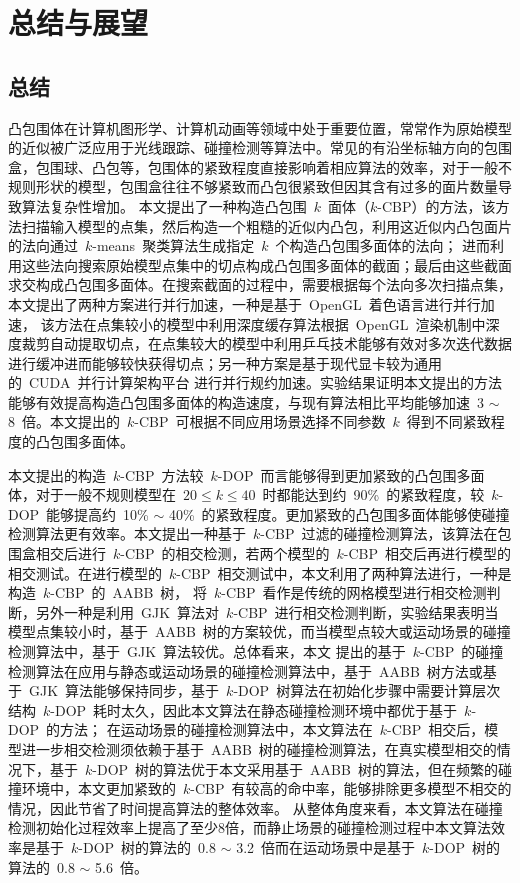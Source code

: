 

\chapter{总结与展望}
\label{cha:summery:futurework}
\section{总结}
\label{sec:summery}

凸包围体在计算机图形学、计算机动画等领域中处于重要位置，常常作为原始模型的近似被广泛应用于光线跟踪、碰撞检测等算法中。常见的有沿坐标轴方向的包围盒，包围球、凸包等，包围体的紧致程度直接影响着相应算法的效率，对于一般不规则形状的模型，包围盒往往不够紧致而凸包很紧致但因其含有过多的面片数量导致算法复杂性增加。
本文提出了一种构造凸包围~$k$~面体（$k$-CBP）的方法，该方法扫描输入模型的点集，然后构造一个粗糙的近似内凸包，利用这近似内凸包面片的法向通过~$k$-means~聚类算法生成指定~$k$~个构造凸包围多面体的法向；
进而利用这些法向搜索原始模型点集中的切点构成凸包围多面体的截面；最后由这些截面求交构成凸包围多面体。在搜索截面的过程中，需要根据每个法向多次扫描点集，本文提出了两种方案进行并行加速，一种是基于~OpenGL~着色语言进行并行加速，
该方法在点集较小的模型中利用深度缓存算法根据~OpenGL~渲染机制中深度裁剪自动提取切点，在点集较大的模型中利用乒乓技术能够有效对多次迭代数据进行缓冲进而能够较快获得切点；另一种方案是基于现代显卡较为通用的~CUDA~并行计算架构平台
进行并行规约加速。实验结果证明本文提出的方法能够有效提高构造凸包围多面体的构造速度，与现有算法相比平均能够加速~3 $\sim$ 8~倍。本文提出的~$k$-CBP~可根据不同应用场景选择不同参数~$k$~得到不同紧致程度的凸包围多面体。

本文提出的构造~$k$-CBP~方法较~$k$-DOP~而言能够得到更加紧致的凸包围多面体，对于一般不规则模型在~$20 \leq k \leq 40 $~时都能达到约~90\%~的紧致程度，较~$k$-DOP~能够提高约~10\% $\sim$ 40\%~的紧致程度。更加紧致的凸包围多面体能够使碰撞检测算法更有效率。本文提出一种基于~$k$-CBP~过滤的碰撞检测算法，该算法在包围盒相交后进行~$k$-CBP~的相交检测，若两个模型的~$k$-CBP~相交后再进行模型的相交测试。在进行模型的~$k$-CBP~相交测试中，本文利用了两种算法进行，一种是构造~$k$-CBP~的~AABB~树，
将~$k$-CBP~看作是传统的网格模型进行相交检测判断，另外一种是利用~GJK~算法对~$k$-CBP~进行相交检测判断，实验结果表明当模型点集较小时，基于~AABB~树的方案较优，而当模型点较大或运动场景的碰撞检测算法中，基于~GJK~算法较优。总体看来，本文
提出的基于~$k$-CBP~的碰撞检测算法在应用与静态或运动场景的碰撞检测算法中，基于~AABB~树方法或基于~GJK~算法能够保持同步，基于~$k$-DOP~树算法在初始化步骤中需要计算层次结构~$k$-DOP~耗时太久，因此本文算法在静态碰撞检测环境中都优于基于~$k$-DOP~的方法；
在运动场景的碰撞检测算法中，本文算法在~$k$-CBP~相交后，模型进一步相交检测须依赖于基于~AABB~树的碰撞检测算法，在真实模型相交的情况下，基于~$k$-DOP~树的算法优于本文采用基于~AABB~树的算法，但在频繁的碰撞环境中，本文更加紧致的~$k$-CBP~有较高的命中率，能够排除更多模型不相交的情况，因此节省了时间提高算法的整体效率。
从整体角度来看，本文算法在碰撞检测初始化过程效率上提高了至少8倍，而静止场景的碰撞检测过程中本文算法效率是基于~$k$-DOP~树的算法的~0.8 $\sim$ 3.2~倍而在运动场景中是基于~$k$-DOP~树的算法的~0.8 $\sim$ 5.6~倍。

